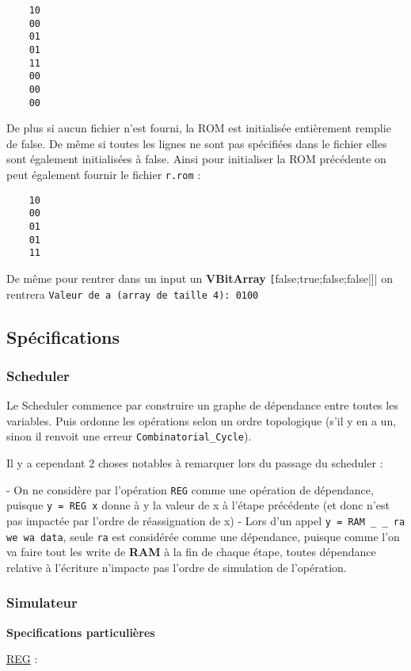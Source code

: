 \documentclass{article}
\begin{document}
\begin{verbatim}
    10
    00
    01
    01
    11
    00
    00
    00
\end{verbatim}

De plus si aucun fichier n'est fourni, la ROM est initialisée entièrement remplie de false. De même si toutes les lignes ne sont pas spécifiées dans le fichier elles sont également initialisées à false. Ainsi pour initialiser la ROM précédente on peut également fournir le fichier \verb|r.rom| :

\begin{verbatim}
    10
    00
    01
    01
    11
\end{verbatim}

De même pour rentrer dans un input un \textbf{VBitArray} \verb|[|false;true;false;false|]| on rentrera \verb|Valeur de a (array de taille 4): 0100|

\subsection*{Spécifications }

\subsubsection*{Scheduler }

Le Scheduler commence par construire un graphe de dépendance entre toutes les variables. Puis ordonne les opérations selon un ordre topologique (s'il y en a un, sinon il renvoit une erreur \verb|Combinatorial_Cycle|).

Il y a cependant 2 choses notables à remarquer lors du passage du scheduler :

- On ne considère par l'opération \verb|REG| comme une opération de dépendance, puisque \verb|y = REG x| donne  à y la valeur de x à l'étape précédente (et donc n'est pas impactée par l'ordre de réassignation de x)
- Lors d'un appel \verb|y = RAM _ _ ra we wa data|, seule \verb|ra| est considérée comme une dépendance, puisque comme l'on va faire tout les write de \textbf{RAM} à la fin de chaque étape, toutes dépendance relative à l'écriture n'impacte pas l'ordre de simulation de l'opération.

\subsubsection*{Simulateur}
\textbf{Specifications particulières }

\underline{REG} :
\end{document}
